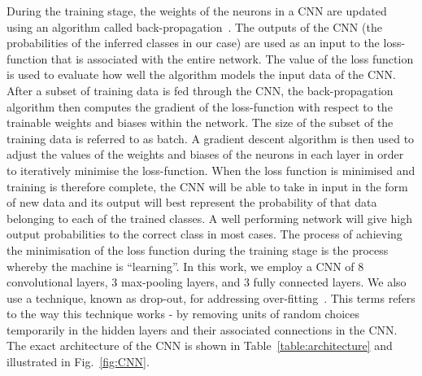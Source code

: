 \documentclass[aps,twocolumn,showpacs,groupedaddress, nofootinbib]{revtex4}  %
\begin{document}
%
%
During the training stage, the weights of the neurons in a \ac{CNN} are updated
using an algorithm called back-propagation~\cite{lecun1988theoretical}. The
outputs of the \ac{CNN} (the probabilities of the inferred classes in our case) are used as an input to the loss-function that is associated with the entire network.  
The value of the loss function is used to evaluate how well the algorithm models the input data of the \ac{CNN}.
After a subset of training data is fed through the \ac{CNN}, the back-propagation algorithm 
then computes the gradient of the loss-function with respect
to the trainable weights and biases within the network. 
The size of the subset of the training data is referred to as batch.
A gradient descent algorithm is then used to adjust the values of the weights and biases of the
neurons in each layer in order to iteratively minimise the loss-function.  
When the loss function is minimised and training is therefore complete, the \ac{CNN}
will be able to take in input in the form of new data and its output will best
represent the probability of that data belonging to each of the trained
classes. 
A well performing network will give high output probabilities to the
correct class in most cases. The process of achieving the minimisation of the
loss function during the training stage is the process whereby the machine is
\textquotedblleft learning\textquotedblright.
%
% 
In this work, we employ a \ac{CNN} of $8$ convolutional layers, $3$ max-pooling
layers, and $3$ fully connected layers. We also use a technique, known as drop-out, for addressing over-fitting~\cite{srivastava2014dropout}. 
This terms refers to the way this technique works - 
by removing units of random choices temporarily in the hidden layers and their associated connections in the \ac{CNN}.
The exact architecture of the \ac{CNN}
is shown in Table~\ref{table:architecture} and illustrated in
Fig.~\ref{fig:CNN}. 
%
%
\end{document}
